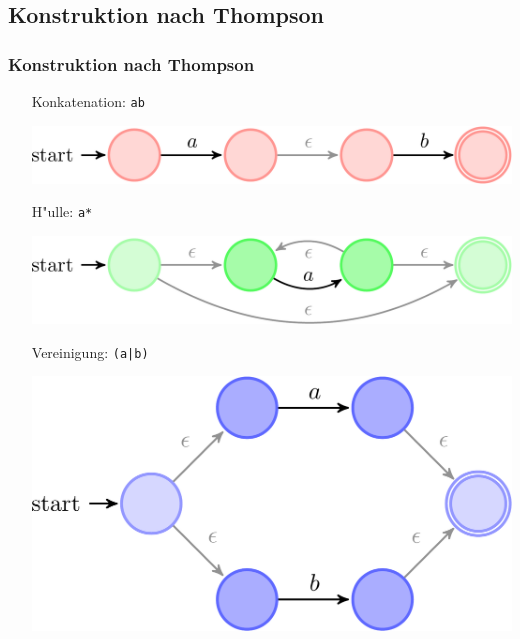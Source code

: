 \documentclass[ignorenonframetext]{beamer}
\begin{document}
\subsection{Konstruktion nach Thompson}
\begin{frame}
    \frametitle{Konstruktion nach Thompson}
	
	\begin{itemize}
		\item[{\color{red}Konkatenation: \texttt{ab}}]
\begin{center}\includegraphics[scale=0.22]{ab.pdf}\end{center}
		\item[]
		\item[{\color{green}H"ulle: \texttt{a*}}]
\begin{center}\includegraphics[scale=0.22]{astar.pdf}\end{center}
		\item[]
		\item[{\color{blue}Vereinigung: \texttt{(a|b)}}]
\begin{center}\includegraphics[scale=0.22]{aorb.pdf}\end{center}
	\end{itemize}
\end{frame}
\end{document}

